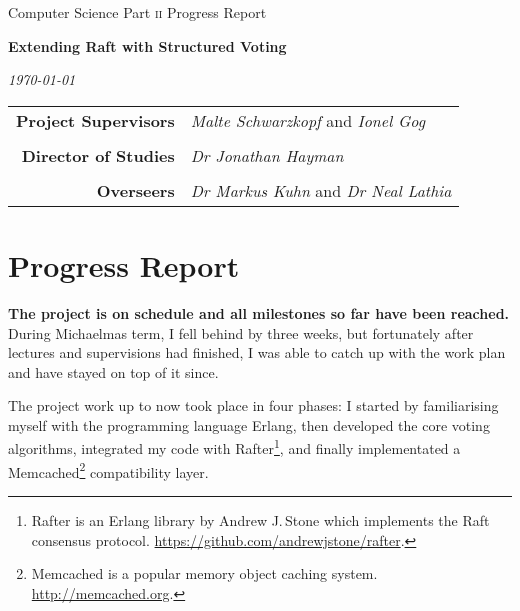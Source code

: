 \documentclass[11pt]{scrartcl}
\begin{document}
\thispagestyle{empty}

 \medskip
{} \medskip
{}

\vfil

\centerline{\large Computer Science Part \textsc{ii} Progress Report} \vspace{0.4in}
\centerline{\Large\bf Extending Raft with Structured Voting} \vspace{0.3in}
\centerline{\large\it \today}

\vfil

\begin{center}
\begin{tabularx}{316pt}{rX}
\textbf{Project Supervisors} & \textit{Malte Schwarzkopf} and \textit{Ionel Gog} \\ \\
\textbf{Director of Studies} & \textit{Dr Jonathan Hayman} \\ \\
\textbf{Overseers} & \textit{Dr Markus Kuhn} and \textit{Dr Neal Lathia}
\end{tabularx}
\end{center}

\newpage

\section{Progress Report%
  \label{progress-report}%
}

\textbf{The project is on schedule and all milestones so far have been reached.} During Michaelmas term, I fell behind by three weeks, but fortunately after lectures and supervisions had finished, I was able to catch up with the work plan and have stayed on top of it since.

The project work up to now took place in four phases: I started by familiarising myself with the programming language Erlang, then developed the core voting algorithms, integrated my code with Rafter\footnote{Rafter is an Erlang library by Andrew J.\,Stone which implements the Raft consensus protocol. \url{https://github.com/andrewjstone/rafter}.}, and finally implementated a Memcached\footnote{Memcached is a popular memory object caching system. \url{http://memcached.org}.} compatibility layer.
\end{document}
